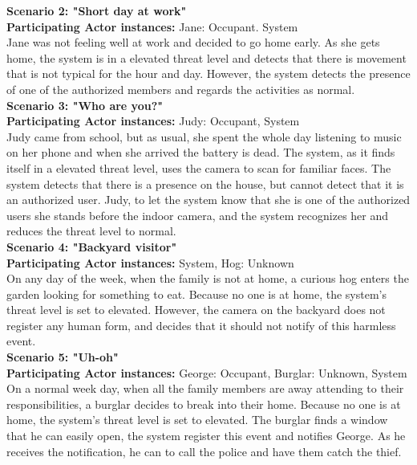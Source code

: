 \textbf{Scenario 2: "Short day at work"} \\
\textbf{Participating Actor instances:} Jane: Occupant. System\\
Jane was not feeling well at work and decided to go home early. As she gets home, the system is in a elevated threat level and detects that there is movement that is not typical for the hour and day. However, the system detects the presence of one of the authorized members and regards the activities as normal.\\

\textbf{Scenario 3: "Who are you?"} \\
\textbf{Participating Actor instances:} Judy: Occupant, System\\
Judy came from school, but as usual, she spent the whole day listening to music on her phone and when she arrived the battery is dead. The system, as it finds itself in a elevated threat level, uses the camera to scan for familiar faces. The system detects that there is a presence on the house, but cannot detect that it is an authorized user. Judy, to let the system know that she is one of the authorized users she stands before the indoor camera, and the system recognizes her and reduces the threat level to normal.  \\

\textbf{Scenario 4: "Backyard visitor"} \\
\textbf{Participating Actor instances:} System, Hog: Unknown\\
On any day of the week, when the family is not at home, a curious hog enters the garden looking for something to eat. Because no one is at home, the system's threat level is set to elevated. However, the camera on the backyard does not register any human form, and decides that it should not notify of this harmless event.\\

\textbf{Scenario 5: "Uh-oh"} \\
\textbf{Participating Actor instances:} George: Occupant, Burglar: Unknown, System\\
On a normal week day, when all the family members are away attending to their responsibilities, a burglar decides to break into their home. Because no one is at home, the system's threat level is set to elevated. The burglar finds a window that he can easily open, the system register this event and notifies George. As he receives the notification, he can to call the police and have them catch the thief. \\

